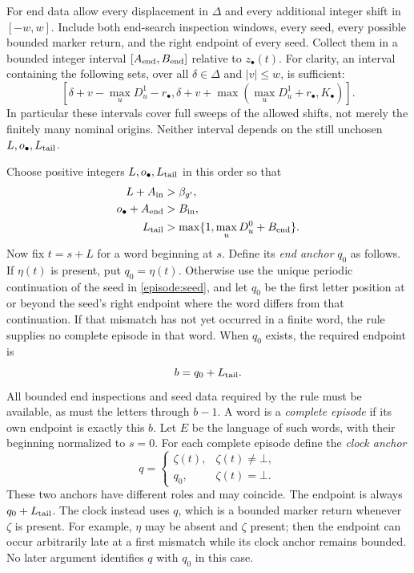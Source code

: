 For end data allow every displacement in $\Delta$ and every additional
integer shift in $[-w,w]$.  Include both end-search inspection windows,
every seed, every possible bounded marker return, and the right endpoint
of every seed.  Collect them in a bounded integer interval
$[A_{\rm end},B_{\rm end}]$ relative to $z_\bullet(t)$. For clarity, an
interval containing the following sets, over all $\delta\in\Delta$ and
$|v|\le w$, is sufficient:
\[
 [\delta+v-\max_uD_u^1-r_\bullet,
   \delta+v+\max(\max_uD_u^1+r_\bullet,K_\bullet)].
\]
In particular these intervals cover full sweeps of the allowed shifts,
not merely the finitely many nominal origins.  Neither interval depends
on the still unchosen $L,o_\bullet,L_{\rm tail}$.

Choose positive integers $L,o_\bullet,L_{\rm tail}$ in this order so that
\begin{equation}\label{schedule:margin-inequalities}
 \begin{split}
 L+A_{\rm in}&>\beta_{g'},\\
 o_\bullet+A_{\rm end}&>B_{\rm in},\\
 L_{\rm tail}&>\max\{1,\max_uD_u^0+B_{\rm end}\}.
 \end{split}
\end{equation}
Now fix $t=s+L$ for a word beginning at $s$.  Define its \emph{end anchor}
$q_0$ as follows.  If $\eta(t)$ is present, put $q_0=\eta(t)$.  Otherwise
use the unique periodic continuation of the seed in
\eqref{episode:seed}, and let $q_0$ be the first letter position at or
beyond the seed's right endpoint where the word differs from that
continuation.  If that mismatch has not yet occurred in a finite word,
the rule supplies no complete episode in that word.  When $q_0$ exists,
the required endpoint is
\begin{equation}\label{episode:endpoint}
 b=q_0+L_{\rm tail}.
\end{equation}
All bounded end inspections and seed data required by the rule must be
available, as must the letters through $b-1$.  A word is a \emph{complete
episode} if its own endpoint is exactly this $b$.  Let $E$ be the language
of such words, with their beginning normalized to $s=0$.  For each complete
episode define the \emph{clock anchor}
\begin{equation}\label{episode:clock-anchor}
 q=\begin{cases}
     \zeta(t),&\zeta(t)\ne\bot,\\
     q_0,&\zeta(t)=\bot.
    \end{cases}
\end{equation}
These two anchors have different roles and may coincide. The endpoint is always
$q_0+L_{\rm tail}$. The clock instead uses $q$, which is a bounded
marker return whenever $\zeta$ is present. For example, $\eta$ may be
absent and $\zeta$ present; then the endpoint can occur arbitrarily late
at a first mismatch while its clock anchor remains bounded. No later
argument identifies $q$ with $q_0$ in this case.

